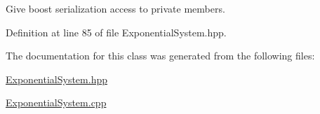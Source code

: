 Give boost serialization access to private members. 



Definition at line 85 of file Exponential\+System.\+hpp.



The documentation for this class was generated from the following files\+:\begin{DoxyCompactItemize}
\item 
\hyperlink{ExponentialSystem_8hpp}{Exponential\+System.\+hpp}\item 
\hyperlink{ExponentialSystem_8cpp}{Exponential\+System.\+cpp}\end{DoxyCompactItemize}
